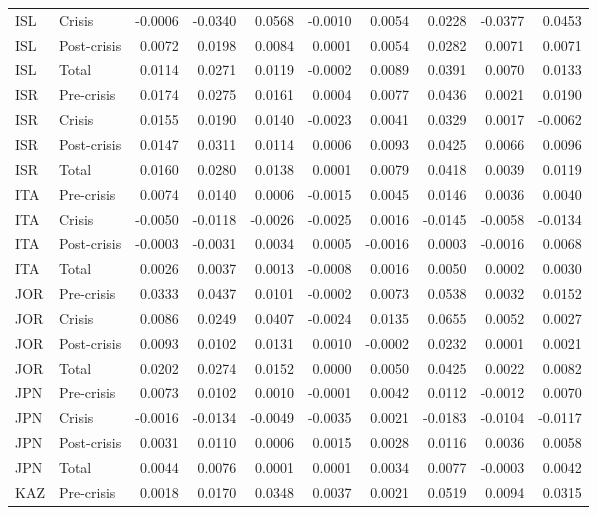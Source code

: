 \begin{longtable}[t]{llrrrrrrrr}
ISL & Crisis & -0.0006 & -0.0340 & 0.0568 & -0.0010 & 0.0054 & 0.0228 & -0.0377 & 0.0453\\
ISL & Post-crisis & 0.0072 & 0.0198 & 0.0084 & 0.0001 & 0.0054 & 0.0282 & 0.0071 & 0.0071\\
ISL & Total & 0.0114 & 0.0271 & 0.0119 & -0.0002 & 0.0089 & 0.0391 & 0.0070 & 0.0133\\
\addlinespace
ISR & Pre-crisis & 0.0174 & 0.0275 & 0.0161 & 0.0004 & 0.0077 & 0.0436 & 0.0021 & 0.0190\\
ISR & Crisis & 0.0155 & 0.0190 & 0.0140 & -0.0023 & 0.0041 & 0.0329 & 0.0017 & -0.0062\\
ISR & Post-crisis & 0.0147 & 0.0311 & 0.0114 & 0.0006 & 0.0093 & 0.0425 & 0.0066 & 0.0096\\
ISR & Total & 0.0160 & 0.0280 & 0.0138 & 0.0001 & 0.0079 & 0.0418 & 0.0039 & 0.0119\\
ITA & Pre-crisis & 0.0074 & 0.0140 & 0.0006 & -0.0015 & 0.0045 & 0.0146 & 0.0036 & 0.0040\\
\addlinespace
ITA & Crisis & -0.0050 & -0.0118 & -0.0026 & -0.0025 & 0.0016 & -0.0145 & -0.0058 & -0.0134\\
ITA & Post-crisis & -0.0003 & -0.0031 & 0.0034 & 0.0005 & -0.0016 & 0.0003 & -0.0016 & 0.0068\\
ITA & Total & 0.0026 & 0.0037 & 0.0013 & -0.0008 & 0.0016 & 0.0050 & 0.0002 & 0.0030\\
JOR & Pre-crisis & 0.0333 & 0.0437 & 0.0101 & -0.0002 & 0.0073 & 0.0538 & 0.0032 & 0.0152\\
JOR & Crisis & 0.0086 & 0.0249 & 0.0407 & -0.0024 & 0.0135 & 0.0655 & 0.0052 & 0.0027\\
\addlinespace
JOR & Post-crisis & 0.0093 & 0.0102 & 0.0131 & 0.0010 & -0.0002 & 0.0232 & 0.0001 & 0.0021\\
JOR & Total & 0.0202 & 0.0274 & 0.0152 & 0.0000 & 0.0050 & 0.0425 & 0.0022 & 0.0082\\
JPN & Pre-crisis & 0.0073 & 0.0102 & 0.0010 & -0.0001 & 0.0042 & 0.0112 & -0.0012 & 0.0070\\
JPN & Crisis & -0.0016 & -0.0134 & -0.0049 & -0.0035 & 0.0021 & -0.0183 & -0.0104 & -0.0117\\
JPN & Post-crisis & 0.0031 & 0.0110 & 0.0006 & 0.0015 & 0.0028 & 0.0116 & 0.0036 & 0.0058\\
\addlinespace
JPN & Total & 0.0044 & 0.0076 & 0.0001 & 0.0001 & 0.0034 & 0.0077 & -0.0003 & 0.0042\\
KAZ & Pre-crisis & 0.0018 & 0.0170 & 0.0348 & 0.0037 & 0.0021 & 0.0519 & 0.0094 & 0.0315\\

\end{longtable}

